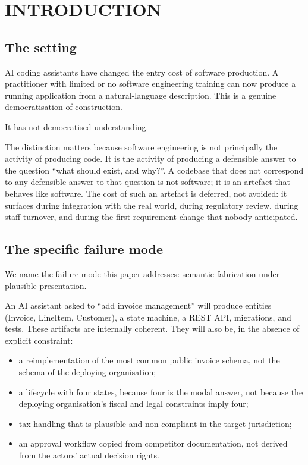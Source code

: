 \documentclass[11pt,a4paper]{article}
\begin{document}
\section{INTRODUCTION}

\subsection{The setting}

AI coding assistants have changed the entry cost of software production. A practitioner with limited or no software engineering training can now produce a running application from a natural-language description. This is a genuine democratisation of construction.

It has not democratised understanding.

The distinction matters because software engineering is not principally the activity of producing code. It is the activity of producing a defensible answer to the question ``what should exist, and why?''. A codebase that does not correspond to any defensible answer to that question is not software; it is an artefact that behaves like software. The cost of such an artefact is deferred, not avoided: it surfaces during integration with the real world, during regulatory review, during staff turnover, and during the first requirement change that nobody anticipated.

\subsection{The specific failure mode}

We name the failure mode this paper addresses: semantic fabrication under plausible presentation.

An AI assistant asked to ``add invoice management'' will produce entities (Invoice, LineItem, Customer), a state machine, a REST API, migrations, and tests. These artifacts are internally coherent. They will also be, in the absence of explicit constraint:

\begin{itemize}[leftmargin=*,nosep,topsep=2pt]
\item a reimplementation of the most common public invoice schema, not the   schema of the deploying organisation;
\item a lifecycle with four states, because four is the modal answer, not   because the deploying organisation's fiscal and legal constraints imply   four;
\item tax handling that is plausible and non-compliant in the target   jurisdiction;
\item an approval workflow copied from competitor documentation, not derived from   the actors' actual decision rights.
\end{itemize}
\end{document}
